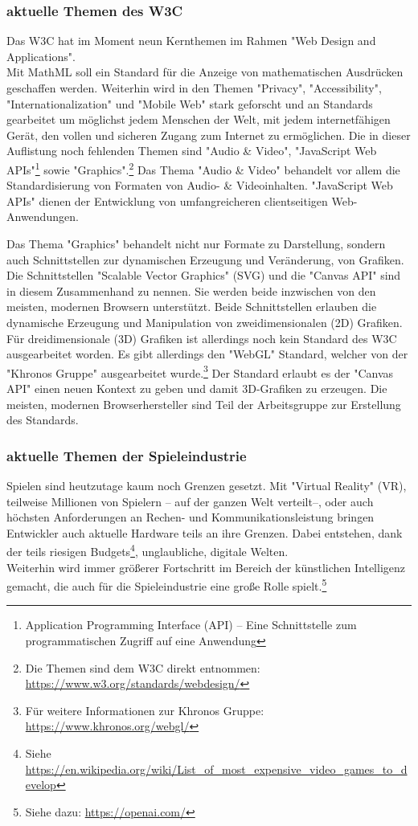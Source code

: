 \subsubsection{aktuelle Themen des W3C}
Das W3C hat im Moment neun Kernthemen im Rahmen "Web Design and Applications".\\
Mit MathML soll ein Standard für die Anzeige von mathematischen Ausdrücken geschaffen werden. Weiterhin wird in den Themen "Privacy", "Accessibility", "Internationalization" und "Mobile Web" stark geforscht und an Standards gearbeitet um möglichst jedem Menschen der Welt, mit jedem internetfähigen Gerät, den vollen und sicheren Zugang zum Internet zu ermöglichen. Die in dieser Auflistung noch fehlenden Themen sind "Audio \& Video", "JavaScript Web APIs"\footnote{Application Programming Interface (API) -- Eine Schnittstelle zum programmatischen Zugriff auf eine Anwendung} sowie "Graphics".\footnote{Die Themen sind dem W3C direkt entnommen: \url{https://www.w3.org/standards/webdesign/}}
Das Thema "Audio \& Video" behandelt vor allem die Standardisierung von Formaten von Audio- \& Videoinhalten. "JavaScript Web APIs" dienen der Entwicklung von umfangreicheren clientseitigen Web-Anwendungen.

\noindent Das Thema "Graphics" behandelt nicht nur Formate zu Darstellung, sondern auch Schnittstellen zur dynamischen Erzeugung und Veränderung, von Grafiken. Die Schnittstellen "Scalable Vector Graphics" (SVG) und die "Canvas API" sind in diesem Zusammenhand zu nennen. Sie werden beide inzwischen von den meisten, modernen Browsern unterstützt. Beide Schnittstellen erlauben die dynamische Erzeugung und Manipulation von zweidimensionalen (2D) Grafiken. Für dreidimensionale (3D) Grafiken ist allerdings noch kein Standard des W3C ausgearbeitet worden. Es gibt allerdings den "WebGL" Standard, welcher von der "Khronos Gruppe" ausgearbeitet wurde.\footnote{Für weitere Informationen zur Khronos Gruppe: \url{https://www.khronos.org/webgl/}} Der Standard erlaubt es der "Canvas API" einen neuen Kontext zu geben und damit 3D-Grafiken zu erzeugen. Die meisten, modernen Browserhersteller sind Teil der Arbeitsgruppe zur Erstellung des Standards.

\subsubsection{aktuelle Themen der Spieleindustrie}
Spielen sind heutzutage kaum noch Grenzen gesetzt. Mit "Virtual Reality" (VR), teilweise Millionen von Spielern -- auf der ganzen Welt verteilt--, oder auch höchsten Anforderungen an Rechen- und Kommunikationsleistung bringen Entwickler auch aktuelle Hardware teils an ihre Grenzen. Dabei entstehen, dank der teils riesigen Budgets\footnote{Siehe \url{https://en.wikipedia.org/wiki/List_of_most_expensive_video_games_to_develop}}, unglaubliche, digitale Welten.\\
Weiterhin wird immer größerer Fortschritt im Bereich der künstlichen Intelligenz gemacht, die auch für die Spieleindustrie eine große Rolle spielt.\footnote{Siehe dazu: \url{https://openai.com/}}
